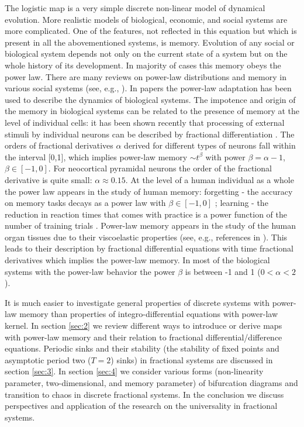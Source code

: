 \documentclass[graybox]{svmult}
\begin{document}
The logistic map is a very simple discrete non-linear model of dynamical
evolution. More realistic models of biological, economic, and social
systems are more complicated. One of the features, not
reflected in this equation but which is present in all the abovementioned systems, 
is memory. Evolution of any social or biological system depends not
only on the current state of a system but on the whole history of its
development. In majority of cases this memory obeys the power law.
There are many reviews on power-law distributions and memory in various 
social systems (see, e.g., \cite{Mach}). In papers 
\cite{Adaptation3,Adaptation4,Adaptation2,Adaptation5,Adaptation1,Adaptation6} 
the power-law adaptation has been used to describe the dynamics of biological 
systems. The impotence and origin of the memory in biological systems can be 
related to the presence of memory at the level of individual cells:  
it has been shown recently that processing of external stimuli by individual neurons 
can be described by fractional differentiation \cite{Neuron3,Neuron4,Neuron5}. 
The orders of fractional derivatives $\alpha$ derived for different types of 
neurons fall within the interval [0,1], which implies power-law memory 
$\sim t^{\beta}$ with power $\beta = \alpha - 1$, $\beta \in [-1,0]$. 
For neocortical pyramidal neurons the order of the fractional derivative 
is quite small: $\alpha \approx 0.15$. 
At the level of a human individual as a whole the power law appears in the 
study of human memory: forgetting - the accuracy on memory tasks decays as a power law with $\beta \in [-1,0]$ 
\cite{Kahana,Rubin,Wixted1,Wixted2,Adaptation1}; 
learning - the reduction in reaction times that comes with
practice is a power function of the number of training trials \cite{Anderson}.
Power-law memory appears in the study of the human organ tissues
due to their viscoelastic properties (see, e.g., references in \cite{Chaos2015}). 
This leads to their description by fractional differential equations with
time fractional derivatives which implies the power-law memory. In most of the
biological systems with the power-law behavior the power $\beta$ is between -1 and 1 ($0 < \alpha <2$).
 
It is much easier to investigate general properties of discrete systems with power-law memory than properties of integro-differential equations with power-law kernel. In section \ref{sec:2} we review different ways to introduce or derive maps with power-law memory and their relation to fractional differential/difference equations. 
Periodic sinks and their stability (the stability of fixed points and asymptotic period two ($T=2$) sinks) in fractional systems are discussed in section \ref{sec:3}. In section \ref{sec:4} we consider various forms (non-linearity parameter, two-dimensional, and memory parameter) of bifurcation diagrams and transition to chaos in discrete fractional systems. In the conclusion we discuss perspectives and application of the research on the universality in fractional systems.  
\end{document}
